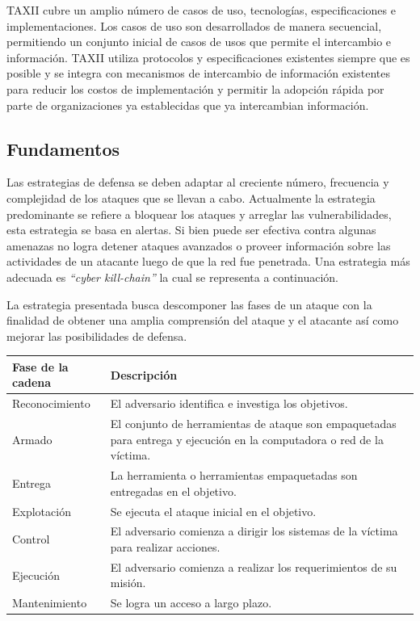 TAXII cubre un amplio número de casos de uso, tecnologías, especificaciones e 
implementaciones. Los casos de uso son desarrollados de manera secuencial, 
permitiendo un conjunto inicial de casos de usos que permite el intercambio e 
información. TAXII utiliza protocolos y especificaciones existentes siempre que 
es posible y se integra con mecanismos de intercambio de información existentes 
para reducir los costos de implementación y permitir la adopción rápida por 
parte de organizaciones ya establecidas que ya intercambian información.

\subsection{Fundamentos}
Las estrategias de defensa se deben adaptar al creciente número, frecuencia y 
complejidad de los ataques que se llevan a cabo. Actualmente la estrategia 
predominante se refiere a bloquear los ataques y arreglar las vulnerabilidades, 
esta estrategia se basa en alertas. Si bien puede ser efectiva contra algunas 
amenazas no logra detener ataques avanzados o proveer información sobre las 
actividades de un atacante luego de que la red fue penetrada. Una estrategia más 
adecuada es \emph{``cyber kill-chain''} la cual se representa a continuación.

La estrategia presentada busca descomponer las fases de un ataque con la 
finalidad de obtener una amplia comprensión del ataque y el atacante así como 
mejorar las posibilidades de defensa.

\begin{center}
    \begin{tabular}{ | l | p{8cm} |}
    \hline
    Fase de la cadena & Descripción \\ \hline
    Reconocimiento & El adversario identifica e investiga los objetivos. \\ \hline
    Armado & El conjunto de herramientas de ataque son empaquetadas para entrega
     y ejecución en la computadora o red de la víctima.  \\ \hline
    Entrega & La herramienta o herramientas empaquetadas son entregadas en el objetivo. \\ \hline
    Explotación & Se ejecuta el ataque inicial en el objetivo.  \\ \hline
    Control & El adversario comienza a dirigir los sistemas de la víctima para realizar acciones. \\ \hline 
    Ejecución & El adversario comienza a realizar los requerimientos de su misión.  \\ \hline
    Mantenimiento & Se logra un acceso a largo plazo.  \\ \hline
    \end{tabular}
\end{center}

